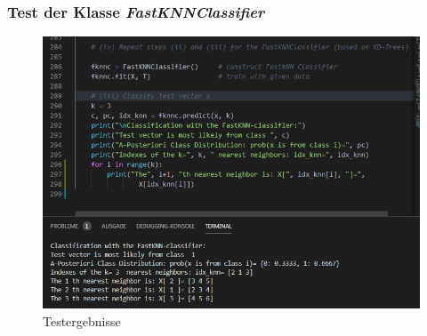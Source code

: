 \subsubsection{Test der Klasse \textit{FastKNNClassifier}}

\begin{figure}[H]
    \centering
    \includegraphics[width=1\linewidth]{files/aufgabe2d3.png}
    \caption{Testergebnisse}
\end{figure}